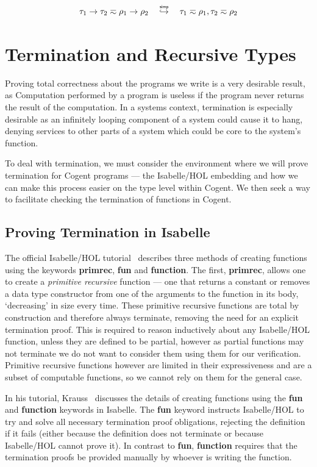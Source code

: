 \[
    \tau_1 \rightarrow \tau_2 \typeeq \rho_1 \rightarrow \rho_2 
    \hspace{1em} \simp \hspace{1em}
    \tau_1 \typeeq \rho_1, \tau_2 \typeeq \rho_2
\]



\section{Termination and Recursive Types}

Proving total correctness about the programs we write is a very desirable result, as
Computation performed by a program is useless if the program never returns the
result of the computation.
In a systems context, termination is especially desirable as an infinitely looping component of a
system could cause it to hang, denying services to other parts of a system which could be core to the
system's function.

To deal with termination, we must consider the environment where we will prove termination for
Cogent programs --- the Isabelle/HOL embedding and how we can make this process easier on the type
level within Cogent. We then seek a way to facilitate checking the termination of functions
in Cogent.

\subsection{Proving Termination in Isabelle}

The official Isabelle/HOL tutorial~\citep{IsabelleTutorial} describes three methods of creating functions using
the keywords \textbf{primrec}, \textbf{fun} and \textbf{function}. The first, \textbf{primrec},
allows one to create a \textit{primitive recursive} function --- one that returns a constant or removes
a data type constructor from one of the arguments to the function in its body, `decreasing' in size every time.
These primitive recursive functions are total by construction and therefore always terminate, removing the need for
an explicit termination proof. This is required to reason inductively about any Isabelle/HOL function,
unless they are defined to be partial, however as partial functions may not terminate we do not want
to consider them using them for our verification. Primitive recursive functions however are limited
in their expressiveness and are a subset of computable functions, so we cannot rely on them for the general case.

In his tutorial, Krauss~\citep{KraussIsabelle} discusses the details of creating functions using the \textbf{fun}
and \textbf{function} keywords in Isabelle. The \textbf{fun} keyword instructs Isabelle/HOL to try and solve all necessary
termination proof obligations, rejecting the definition if it fails (either because the definition does not 
terminate or because Isabelle/HOL cannot prove it). In contrast to \textbf{fun}, \textbf{function}
requires that the termination proofs be provided manually by whoever is writing the function.

